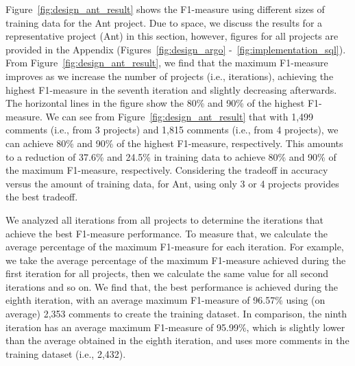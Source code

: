  Figure~\ref{fig:design_ant_result} shows the F1-measure using different sizes of training data for the Ant project. Due to space, we discuss the results for a representative project (Ant) in this section, however, figures for all projects are provided in the Appendix (Figures~\ref{fig:design_argo} -~\ref{fig:implementation_sql}). From Figure~\ref{fig:design_ant_result}, we find that the maximum F1-measure improves as we increase the number of projects (i.e., iterations), achieving the highest F1-measure in the seventh iteration and slightly decreasing afterwards. The horizontal lines in the figure show the 80\% and 90\% of the highest F1-measure. We can see from Figure~\ref{fig:design_ant_result} that with 1,499 comments (i.e., from 3 projects) and 1,815 comments (i.e., from 4 projects), we can achieve 80\% and 90\% of the highest F1-measure, respectively. This amounts to a reduction of  37.6\% and 24.5\% in training data to achieve 80\% and 90\% of the maximum F1-measure, respectively. Considering the tradeoff in accuracy versus the amount of training data, for Ant, using only 3 or 4 projects provides the best tradeoff.

We analyzed all iterations from all projects to determine the iterations that achieve the best F1-measure performance. To measure that, we calculate the average percentage of the maximum F1-measure for each iteration. For example, we take the average percentage of the maximum F1-measure achieved during the first iteration for all projects, then we calculate the same value for all second iterations and so on. We find that, the best performance is achieved during the eighth iteration, with an average maximum F1-measure of 96.57\% using (on average) 2,353 comments to create the training dataset. In comparison, the ninth iteration has an average  maximum F1-measure of 95.99\%, which is slightly lower than the average obtained in the eighth iteration, and uses more comments in the training dataset (i.e., 2,432).

